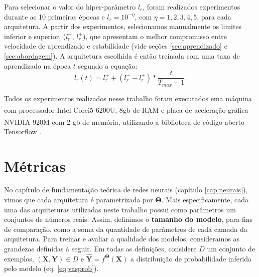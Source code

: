 Para selecionar o valor do hiper-parâmetro $l_r$, foram realizados experimentos durante as 10 primeiras épocas e $l_r=10^{-\eta}$, com $\eta=1, 2, 3, 4, 5$, para cada arquitetura. A partir dos experimentos, selecionamos manualmente os limites inferior e superior, ($l_r^-$, $l_r^+$), que apresentam o melhor compromisso entre velocidade de aprendizado e estabilidade (vide seções \ref{sec:aprendizado} e \ref{sec:abordagem}). A arquitetura escolhida é então treinada com uma taxa de aprendizado na época $t$ segundo a equação:
\begin{equation}
l_r(t) = l_r^+ + (l_r^- - l_r^+) * \frac{t}{T_{max}-1}.
\end{equation}

Todos os experimentos realizados nesse trabalho foram executados ema máquina com processador Intel\textsuperscript{\textregistered} Core\texttrademark i5-6200U, 8gb de RAM e placa de aceleração gráfica NVIDIA\textsuperscript{\textregistered} 920M com 2 gb de memória, utilizando a biblioteca de código aberto Tensorflow \cite{abadi2016tensorflow}.

\section{Métricas}

No capítulo de fundamentação teórica de redes neurais (capítulo \ref{cap:neurais}), vimos que cada arquitetura é parametrizada por $\mathbf{\Theta}$. Mais especificamente, cada uma das arquiteturas utilizadas neste trabalho possui como parâmetros um conjuntos de números reais. Assim, definimos o \textbf{tamanho do modelo}, para fins de comparação, como a soma da quantidade de parâmetros de cada camada da arquitetura. Para treinar e avaliar a qualidade dos modelos, consideramos as grandezas definidas à seguir. Em todas as definições, considere $D$ um conjunto de exemplos, $(\mathbf{X}, \mathbf{Y}) \in D$ e $\hat{\mathbf{Y}} = f^{\mathbf{\Theta}}(\mathbf{X})$ a distribuição de probabilidade inferida pelo modelo (eq. \ref{eq:yasprob}). 

